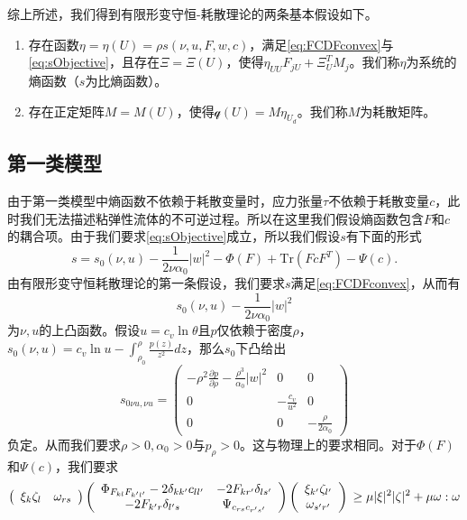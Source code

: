 \documentclass{article}
\begin{document}
综上所述，我们得到有限形变守恒-耗散理论的两条基本假设如下。
\begin{enumerate}
		\item 存在函数$\eta = \eta (U) = \rho s(\nu,u,F,w,c)$，满足\eqref{eq:FCDFconvex}与\eqref{eq:sObjective}，且存在$\Xi=\Xi(U)$，使得$\eta_{UU} F_{jU} + \Xi_U^T M_j $。我们称$\eta$为系统的熵函数（$s$为比熵函数）。
		\item 存在正定矩阵$M = M(U)$，使得$\mathcal{q}(U) = M \eta_{U_d}$。我们称$M$为耗散矩阵。
\end{enumerate}

\subsection{第一类模型}
由于第一类模型中熵函数不依赖于耗散变量时，应力张量$\tau$不依赖于耗散变量$c$，此时我们无法描述粘弹性流体的不可逆过程。所以在这里我们假设熵函数包含$F$和$c$的耦合项。由于我们要求\eqref{eq:sObjective}成立，所以我们假设$s$有下面的形式 
 $$s = s_0(\nu,u) - \frac{1}{2 \nu \alpha_0} |w|^2 - \Phi (F) + \mbox{Tr} (FcF^T) - \Psi(c) .$$
由有限形变守恒耗散理论的第一条假设，我们要求$s$满足\eqref{eq:FCDFconvex}，从而有
\begin{equation*}
	s_0(\nu,u) - \frac{1}{2\nu \alpha_0}|w|^2
\end{equation*}
为$\nu,u$的上凸函数。假设$u = c_v \ln \theta$且$p$仅依赖于密度$\rho$，$s_0(\nu,u) = c_v \ln u - \int_{\rho_0}^\rho \frac{p(z)}{z^2}dz$，那么$s_0$下凸给出
\begin{equation*}
	s_{0\nu u,\nu u} = \left( \begin{array}{ccc}
		- \rho^2 \frac{\partial p}{\partial \rho} - \frac{\rho^3}{\alpha_0}|w|^2 & 0 & 0 \\
		0 & -\frac{c_v}{u^2} & 0 \\
		0 & 0 & -\frac{\rho}{2\alpha_0}
	\end{array}\right)
\end{equation*}
负定。从而我们要求$\rho>0,\alpha_0>0$与$p_\rho>0$。这与物理上的要求相同。对于$\Phi(F)$和$\Psi(c)$，我们要求
\begin{equation*}
	\left( \begin{array}{cc}
		\xi_k \zeta_l & \omega_{rs} 
	\end{array}\right)
	\left( \begin{array}{cc}
		\Phi_{F_{kl}F_{k'l'}} - 2\delta_{kk'} c_{ll'}& -2 F_{kr'} \delta_{ls'} \\
		-2 F_{k'r} \delta_{l's} & \Psi_{c_{rs}c_{r's'}}
	\end{array}\right) 
	\left( \begin{array}{c}
		\xi_{k'}  \zeta_{l'} \\ \omega_{s'r'} 
	\end{array}\right) \\
	\ge \mu |\xi|^2|\zeta|^2 + \mu \omega:\omega
\end{equation*}
\end{document}
